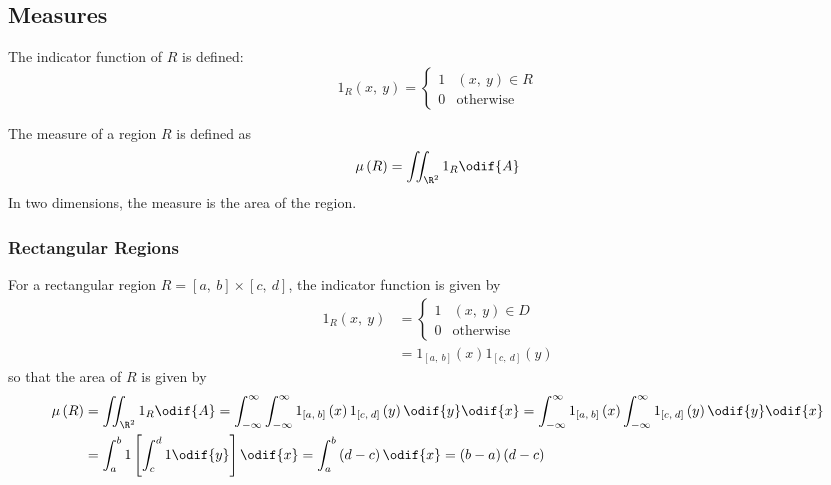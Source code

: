 \documentclass{article}
\begin{document}
\subsection{Measures}
\begin{definition}
    The indicator function of \(R\) is defined:
    \begin{equation*}
        1_R\left( x,\: y \right) =
        \begin{cases}
            1 & \left( x,\: y \right) \in R \\
            0 & \text{otherwise}
        \end{cases}
    \end{equation*}
\end{definition}
\begin{definition}[Measure]
    The measure of a region \(R\) is defined as
    \begin{equation*}
        \mu\left( R \right) = \iint_{\R^2} 1_R \odif{A}
    \end{equation*}
    In two dimensions, the measure is the area of the region.
\end{definition}
\subsubsection{Rectangular Regions}
For a rectangular region \(R = \left[ a,\: b \right] \times \left[ c,\:
d \right]\), the indicator function is given by
\begin{align*}
    1_R\left( x,\: y \right) & =
    \begin{cases}
        1 & \left( x,\: y \right) \in D \\
        0 & \text{otherwise}
    \end{cases}
    \\
                             & = 1_{\left[ a,\: b \right]} \left( x \right) 1_{\left[ c,\: d \right]} \left( y \right)
\end{align*}
so that the area of \(R\) is given by
\begin{align*}
    \mu\left( R \right) & = \iint_{\R^2} 1_R \odif{A} = \int_{-\infty}^\infty \int_{-\infty}^\infty 1_{\left[ a,\: b \right]} \left( x \right) 1_{\left[ c,\: d \right]} \left( y \right) \odif{y} \odif{x} = \int_{-\infty}^\infty 1_{\left[ a,\: b \right]} \left( x \right) \int_{-\infty}^\infty 1_{\left[ c,\: d \right]} \left( y \right) \odif{y} \odif{x} \\
                        & = \int_a^b 1 \left[ \int_c^d 1 \odif{y} \right] \odif{x} = \int_a^b \left( d - c \right) \odif{x} = \left( b - a \right) \left( d - c \right)
\end{align*}
\end{document}
